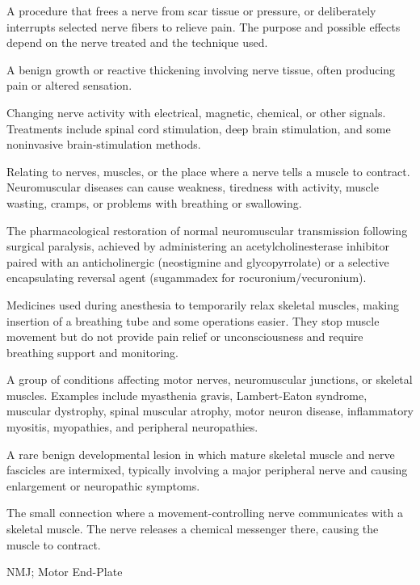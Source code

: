  A procedure that frees a nerve from scar tissue or pressure, or deliberately interrupts selected nerve fibers to relieve pain. The purpose and possible effects depend on the nerve treated and the technique used.

 A benign growth or reactive thickening involving nerve tissue, often producing pain or altered sensation.

 Changing nerve activity with electrical, magnetic, chemical, or other signals. Treatments include spinal cord stimulation, deep brain stimulation, and some noninvasive brain-stimulation methods.

 Relating to nerves, muscles, or the place where a nerve tells a muscle to contract. Neuromuscular diseases can cause weakness, tiredness with activity, muscle wasting, cramps, or problems with breathing or swallowing.

 The pharmacological restoration of normal neuromuscular transmission following surgical paralysis, achieved by administering an acetylcholinesterase inhibitor paired with an anticholinergic (neostigmine and glycopyrrolate) or a selective encapsulating reversal agent (sugammadex for rocuronium/vecuronium).

 Medicines used during anesthesia to temporarily relax skeletal muscles, making insertion of a breathing tube and some operations easier. They stop muscle movement but do not provide pain relief or unconsciousness and require breathing support and monitoring.

 A group of conditions affecting motor nerves, neuromuscular junctions, or skeletal muscles. Examples include myasthenia gravis, Lambert-Eaton syndrome, muscular dystrophy, spinal muscular atrophy, motor neuron disease, inflammatory myositis, myopathies, and peripheral neuropathies.

 A rare benign developmental lesion in which mature skeletal muscle and nerve fascicles are intermixed, typically involving a major peripheral nerve and causing enlargement or neuropathic symptoms.

 The small connection where a movement-controlling nerve communicates with a skeletal muscle. The nerve releases a chemical messenger there, causing the muscle to contract.

\synonyms
NMJ; Motor End-Plate

